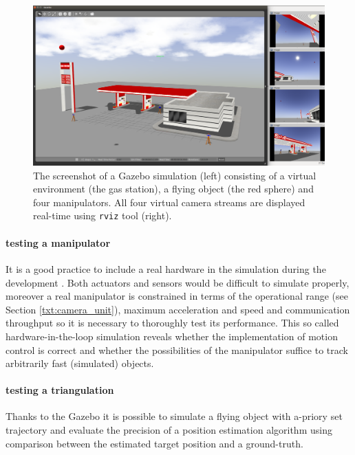 \begin{figure}[htb]
	\centering
	\includegraphics[width=15.5cm]{fig/gazebo_camera_stream.png}
	\caption{The screenshot of a Gazebo simulation (left) consisting of a virtual environment (the gas station), a flying object (the red sphere) and four manipulators. All four virtual camera streams are displayed real-time using \texttt{rviz} tool (right).}
	\label{fig:gazebo_camera_stream}
\end{figure}

\paragraph{testing a manipulator} It is a good practice to include a real hardware in the simulation during the development \cite{on_hw_in_the_loop}. Both actuators and sensors would be difficult to simulate properly, moreover a real manipulator is constrained in terms of the operational range (see Section \ref{txt:camera_unit}), maximum acceleration and speed and communication throughput so it is necessary to thoroughly test its performance. This so called hardware-in-the-loop simulation reveals whether the implementation of motion control is correct and whether the possibilities of the manipulator suffice to track arbitrarily fast (simulated) objects.

\paragraph{testing a triangulation} Thanks to the Gazebo it is possible to simulate a flying object with a-priory set trajectory and evaluate the precision of a position estimation algorithm using comparison between the estimated target position and a ground-truth.

